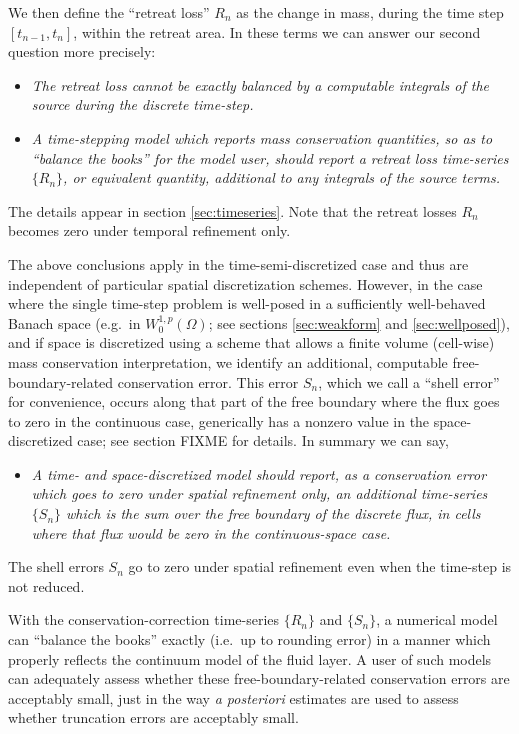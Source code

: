 \documentclass[final,leqno,onefignum,onetabnum]{siamltex1213bueler}
\begin{document}
We then define the ``retreat loss'' $R_n$ as the change in mass, during the time step $[t_{n-1},t_n]$, within the retreat area.  In these terms we can answer our second question more precisely:
\begin{itemize}
\item  \emph{The retreat loss cannot be exactly balanced by a computable integrals of the source during the discrete time-step.}
\item  \emph{A time-stepping model which reports mass conservation quantities, so as to ``balance the books'' for the model user, should report a retreat loss time-series $\{R_n\}$, or equivalent quantity, additional to any integrals of the source terms.}
\end{itemize}
The details appear in section \ref{sec:timeseries}.  Note that the retreat losses $R_n$ becomes zero under temporal refinement only.

The above conclusions apply in the time-semi-discretized case and thus are independent of particular spatial discretization schemes.  However, in the case where the single time-step problem is well-posed in a sufficiently well-behaved Banach space (e.g.~in $W_0^{1,p}(\Omega)$; see sections \ref{sec:weakform} and \ref{sec:wellposed}), and if space is discretized using a scheme that allows a finite volume (cell-wise) mass conservation interpretation, we identify an additional, computable free-boundary-related conservation error.  This error $S_n$, which we call a ``shell error'' for convenience, occurs along that part of the free boundary where the flux goes to zero in the continuous case, generically has a nonzero value in the space-discretized case; see section FIXME for details.  In summary we can say,
\begin{itemize}
\item  \emph{A time- and space-discretized model should report, as a conservation error which goes to zero under spatial refinement only, an additional time-series $\{S_n\}$ which is the sum over the free boundary of the discrete flux, in cells where that flux would be zero in the continuous-space case.}
\end{itemize}
The shell errors $S_n$ go to zero under spatial refinement even when the time-step is not reduced.

With the conservation-correction time-series $\{R_n\}$ and $\{S_n\}$, a numerical model can ``balance the books'' exactly (i.e.~up to rounding error) in a manner which properly reflects the continuum model of the fluid layer.  A user of such models can adequately assess whether these free-boundary-related conservation errors are acceptably small, just in the way \emph{a posteriori} estimates are used to assess whether truncation errors are acceptably small.
\end{document}
